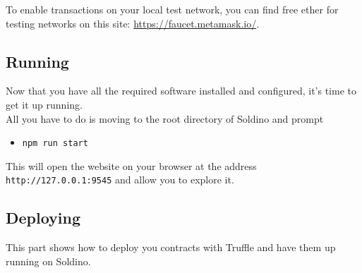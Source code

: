 To enable transactions on your local test network, you can find free ether for testing networks on this site: \href{https://faucet.metamask.io/}{https://faucet.metamask.io/}.


\subsection{Running}
Now that you have all the required software installed and configured, it's time to get it up running.\\
All you have to do is moving to the root directory of Soldino and prompt
\begin{itemize}
	\item[]\texttt{npm run start}
\end{itemize}
This will open the website on your browser at the address \texttt{http://127.0.0.1:9545} and allow you to explore it. 


\subsection{Deploying}
This part shows how to deploy you contracts with Truffle and have them up running on Soldino.
% 